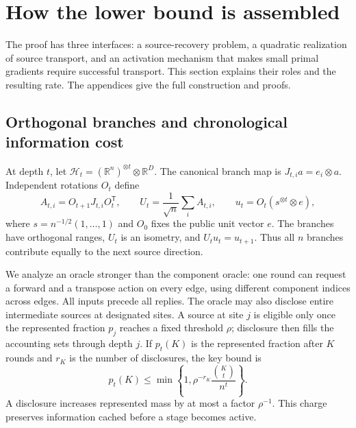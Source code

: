 \documentclass[11pt,letterpaper]{article}
\theoremstyle{definition}
\theoremstyle{remark}
\newcommand{\R}{\mathbb R}
\begin{document}
\section{How the lower bound is assembled}
\label{sec:overview}

The proof has three interfaces: a source-recovery problem, a quadratic
realization of source transport, and an activation mechanism that makes
small primal gradients require successful transport. This section explains
their roles and the resulting rate. The appendices give the full
construction and proofs.

\subsection{Orthogonal branches and chronological information cost}

At depth $t$, let $\mathcal H_t=(\R^n)^{\otimes t}\otimes\R^D$.
The canonical branch map is $J_{t,i}a=e_i\otimes a$. Independent rotations
$O_t$ define
\begin{equation}
 A_{t,i}=O_{t+1}J_{t,i}O_t^{\mathsf T},\qquad
 U_t=\frac1{\sqrt n}\sum_i A_{t,i},\qquad
 u_t=O_t(s^{\otimes t}\otimes e),
 \label{eq:overview-source}
\end{equation}
where $s=n^{-1/2}(1,\ldots,1)$ and $O_0$ fixes the public unit vector $e$.
The branches have orthogonal ranges, $U_t$ is an isometry, and
$U_tu_t=u_{t+1}$. Thus all $n$ branches contribute equally to the next
source direction.

We analyze an oracle stronger than the component oracle: one round can
request a forward and a transpose action on every edge, using different
component indices across edges. All inputs precede all replies. The oracle
may also disclose entire intermediate sources at designated sites. A source
at site $j$ is eligible only once the represented fraction $p_j$ reaches
a fixed threshold $\rho$; disclosure then fills the accounting sets through
depth $j$. If $p_t(K)$ is the represented fraction after $K$ rounds and
$r_K$ is the number of disclosures, the key bound is
\begin{equation}
 p_t(K)\le\min\left\{1,\rho^{-r_K}\frac{\binom Kt}{n^t}\right\}.
 \label{eq:overview-mass}
\end{equation}
A disclosure increases represented mass by at most a factor $\rho^{-1}$.
This charge preserves information cached before a stage becomes active.
\end{document}
